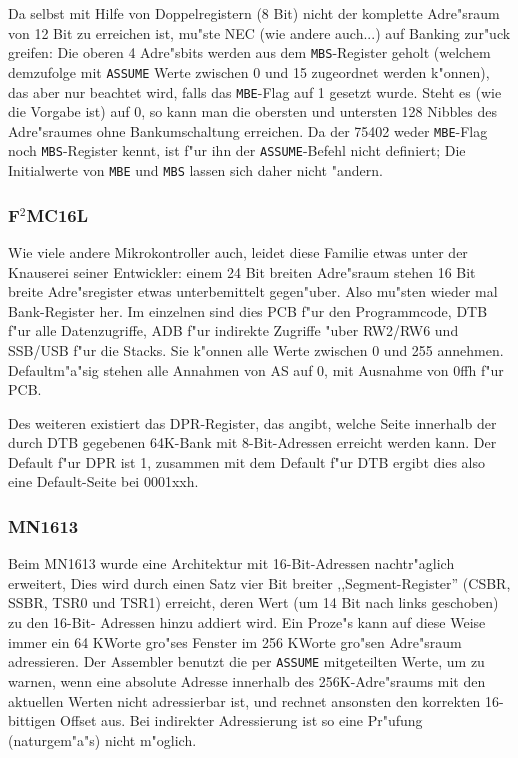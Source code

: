 \documentclass[12pt,a4paper,twoside]{report}
\newcommand{\tty}[1]{{\tt #1}}
\begin{document}
Da selbst mit Hilfe von Doppelregistern (8 Bit) nicht der komplette
Adre"sraum von 12 Bit zu erreichen ist, mu"ste NEC (wie andere auch...)
auf Banking zur"uck greifen: Die oberen 4 Adre"sbits werden aus dem
\tty{MBS}-Register geholt (welchem demzufolge mit \tty{ASSUME} Werte
zwischen 0 und 15 zugeordnet werden k"onnen), das aber nur beachtet
wird, falls das \tty{MBE}-Flag auf 1 gesetzt wurde.  Steht es (wie
die Vorgabe ist) auf 0, so kann man die obersten und untersten 128
Nibbles des Adre"sraumes ohne Bankumschaltung erreichen.  Da der 75402
weder \tty{MBE}-Flag noch \tty{MBS}-Register kennt, ist f"ur ihn der
\tty{ASSUME}-Befehl nicht definiert; Die Initialwerte von \tty{MBE} und
\tty{MBS} lassen sich daher nicht "andern.


\subsubsection{F$^2$MC16L}

Wie viele andere Mikrokontroller auch, leidet diese Familie etwas unter
der Knauserei seiner Entwickler: einem 24 Bit breiten Adre"sraum stehen 16
Bit breite Adre"sregister etwas unterbemittelt gegen"uber.  Also mu"sten
wieder mal Bank-Register her.  Im einzelnen sind dies PCB f"ur den
Programmcode, DTB f"ur alle Datenzugriffe, ADB f"ur indirekte Zugriffe
"uber RW2/RW6 und SSB/USB f"ur die Stacks.  Sie k"onnen alle Werte
zwischen 0 und 255 annehmen.  Defaultm"a"sig stehen alle Annahmen von AS
auf 0, mit Ausnahme von 0ffh f"ur PCB.

Des weiteren existiert das DPR-Register, das angibt, welche Seite
innerhalb der durch DTB gegebenen 64K-Bank mit 8-Bit-Adressen erreicht
werden kann.  Der Default f"ur DPR ist 1, zusammen mit dem Default f"ur
DTB ergibt dies also eine Default-Seite bei 0001xxh.


\subsubsection{MN1613}

Beim MN1613 wurde eine Architektur mit 16-Bit-Adressen nachtr"aglich erweitert,
Dies wird durch einen Satz vier Bit breiter ,,Segment-Register'' (CSBR, SSBR, TSR0
und TSR1) erreicht, deren Wert (um 14 Bit nach links geschoben) zu den 16-Bit-
Adressen hinzu addiert wird.  Ein Proze"s kann auf diese Weise immer ein 64 KWorte
gro"ses Fenster im 256 KWorte gro"sen Adre"sraum adressieren.  Der Assembler
benutzt die per \tty{ASSUME} mitgeteilten Werte, um zu warnen, wenn eine absolute
Adresse innerhalb des 256K-Adre"sraums mit den aktuellen Werten nicht adressierbar
ist, und rechnet ansonsten den korrekten 16-bittigen Offset aus.  Bei indirekter
Adressierung ist so eine Pr"ufung (naturgem"a"s) nicht m"oglich.
\end{document}
